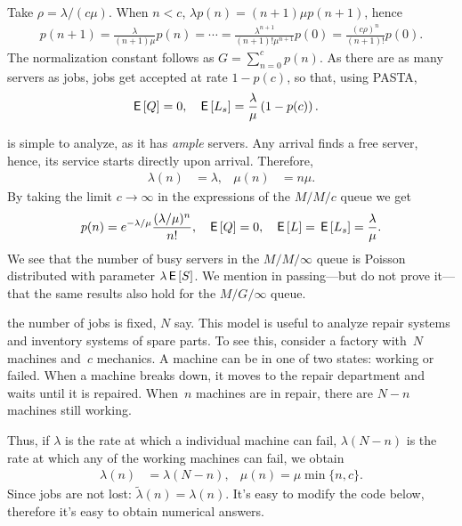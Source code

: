 \documentclass[stochastic-or.tex]{subfiles}
\begin{document}
Take $\rho = \lambda/(c \mu)$. When $n<c$, $\lambda p(n) = (n+1)\mu p(n+1)$, hence
 \begin{align*}
   p(n+1) = \frac{\lambda}{(n+1)\mu }p(n) = \cdots = \frac{\lambda^{n+1}}{(n+1)!\mu^{n+1}} p(0) = \frac{(c\rho)^{n}}{(n+1)!} p(0).
\end{align*}
The normalization constant follows  as $G = \sum_{n=0}^{c}p(n)$. As there are as many servers as jobs, jobs get accepted at rate $1-p(c)$, so that, using PASTA,
 \begin{align*}
   \,\mathsf{E}\left[Q\right] &= 0, & \,\mathsf{E}\left[L_s\right] &= \frac{\lambda}{\mu} \left(1- p(c)\right).
\end{align*}


 is simple to analyze, as it has \emph{ample} servers.
Any arrival finds a free server, hence, its service  starts directly upon arrival.
Therefore,
\begin{align*}
\lambda(n)&=\lambda, & \mu(n) &= n \mu.
\end{align*}
By taking the limit $c\to \infty$ in the expressions of the $M/M/c$ queue we get
\begin{align*}
  p(n) &= e^{-\lambda/\mu} \frac{(\lambda/\mu)^n}{n!}, & \,\mathsf{E}\left[Q\right]&=0, & \,\mathsf{E}\left[L\right] = \,\mathsf{E}\left[L_s\right] = \frac \lambda \mu.
\end{align*}
We see that the number of busy servers in the $M/M/\infty$ queue is Poisson distributed with parameter $\lambda \,\mathsf{E}\left[S\right]$.
We mention in passing---but do not prove it---that the same results also hold for the $M/G/\infty$ queue.

 the number of jobs is fixed, $N$ say.
This model is useful to analyze repair systems and inventory systems of spare parts.
To see this, consider a factory with~$N$ machines and~$c$ mechanics.
A machine can be in one of two states: working or failed.
When a machine breaks down, it moves to the repair department and waits until it is repaired.
When~$n$ machines are in repair, there are $N-n$ machines still working.

Thus, if $\lambda$ is the rate at which a individual machine can fail, $\lambda(N-n)$ is the rate at which any of the working machines can fail,
we obtain
\begin{align*}
  \lambda(n) &= \lambda (N-n), & \mu(n) = \mu \min\{n, c\}.
\end{align*}
Since jobs are not lost: $\tilde \lambda(n) = \lambda(n)$.
It's easy to modify the code below, therefore it's easy to obtain numerical answers.
\end{document}
